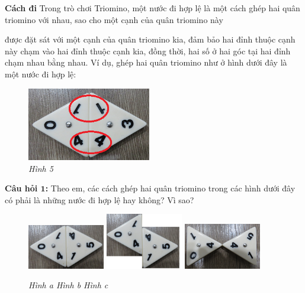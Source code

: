 	{\bf Cách đi}   %
	\vskip 0.1cm
	Trong trò chơi Triomino, một nước đi hợp lệ là một cách ghép hai quân triomino với nhau, sao cho
	một cạnh của quân triomino này 
	\begin{multicols}{2}
		được đặt sát với một cạnh của quân triomino kia, đảm bảo hai đỉnh thuộc cạnh này chạm vào hai đỉnh thuộc cạnh kia, đồng thời, hai số ở hai góc tại hai đỉnh chạm nhau
		bằng nhau. Ví dụ, ghép hai quân triomino như ở hình dưới đây là một nước đi hợp lệ:
		\begin{figure}[H]
			\centering
			\vspace*{5pt}
			\captionsetup{labelformat=empty, justification=centering}
			\includegraphics[width=0.48\textwidth]{dom-09}
			\caption{\textit{\small Hình 5}}
			\vspace*{-10pt}
		\end{figure}
	\end{multicols}
	{\bf Câu hỏi $\pmb{1}$:}  %
	\vskip 0.1cm
	Theo em, các cách ghép hai quân triomino trong các hình dưới đây có phải là những nước đi hợp lệ
	hay không? Vì sao?
	\begin{figure}[H]
		\centering
		\vspace*{-5pt}
		\captionsetup{labelformat=empty, justification=centering}
		\includegraphics[width=0.3\textwidth]{dom-10a}\quad
		\includegraphics[width=0.3\textwidth]{dom-10b}\quad
		\includegraphics[width=0.3\textwidth]{dom-10c}
		\caption{\textit{\small Hình a \hspace{70pt}Hình b \hspace{70pt}Hình c }}
		\vspace*{-5pt}
	\end{figure}
